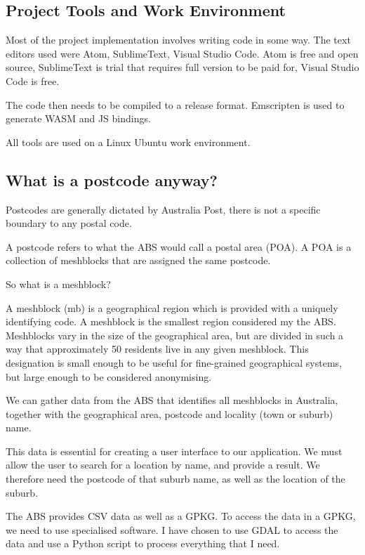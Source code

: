 \documentclass[12pt,a4paper]{report}
\begin{document}
\subsection{Project Tools and Work Environment}

Most of the project implementation involves writing code in some way. The text editors used were Atom, SublimeText, Visual Studio Code. Atom is free and open source, SublimeText is trial that requires full version to be paid for, Visual Studio Code is free.

The code then needs to be compiled to a release format. Emscripten is used to generate WASM and JS bindings. 

All tools are used on a Linux Ubuntu work environment.

\subsection{What is a postcode anyway?}

Postcodes are generally dictated by Australia Post, there is not a specific boundary to any postal code.

A postcode refers to what the ABS would call a postal area (POA). A POA is a collection of meshblocks that are assigned the same postcode. 

So what is a meshblock?

A meshblock (mb) is a geographical region which is provided with a uniquely identifying code. A meshblock is the smallest region considered my the ABS. Meshblocks vary in the size of the geographical area, but are divided in such a way that approximately 50 residents live in any given meshblock. This designation is small enough to be useful for fine-grained geographical systems, but large enough to be considered anonymising. 

We can gather data from the ABS that identifies all meshblocks in Australia, together with the geographical area, postcode and locality (town or suburb) name.

This data is essential for creating a user interface to our application. We must allow the user to search for a location by name, and provide a result. We therefore need the postcode of that suburb name, as well as the location of the suburb.

The ABS provides CSV data as well as a GPKG. To access the data in a GPKG, we need to use specialised software. I have chosen to use GDAL to access the data and use a Python script to process everything that I need. 
\end{document}
